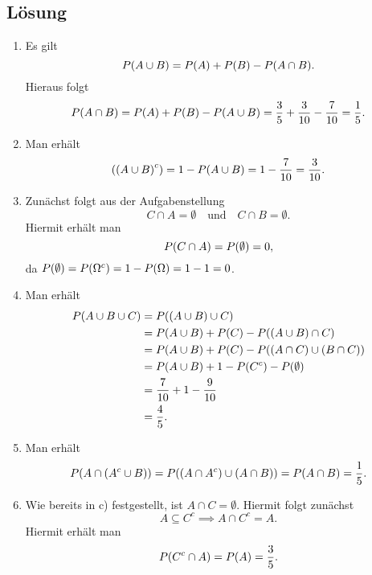 \documentclass{exercise}
\begin{document}
    \subsection*{Lösung}
    \begin{enumerate}
        \item Es gilt
        \[
            P\parentheses*{A \cup B} = P\parentheses*{A} + P\parentheses*{B} - P\parentheses*{A \cap B}.
        \]
        Hieraus folgt
        \[
            P\parentheses*{A \cap B} = P\parentheses*{A} + P\parentheses*{B} - P\parentheses*{A \cup B} = \frac{3}{5} + \frac{3}{10} - \frac{7}{10} = \frac{1}{5}.
        \]
        \item Man erhält
        \[
            \parentheses*{\parentheses*{A \cup B}^c} = 1 - P\parentheses*{A \cup B} = 1 - \frac{7}{10} = \frac{3}{10}.
        \]
        \item Zunächst folgt aus der Aufgabenstellung
        \[
            C \cap A = \emptyset \quad \text{und} \quad C \cap B = \emptyset.
        \]
        Hiermit erhält man
        \[
            P\parentheses*{C \cap A} = P\parentheses*{\emptyset} = 0,
        \]
        da \(P\parentheses*{\emptyset} = P\parentheses*{\Omega^c} = 1 - P\parentheses*{\Omega} = 1 - 1 = 0\).
        \item Man erhält
        \begin{align*}
            P\parentheses*{A \cup B \cup C} &= P\parentheses*{\parentheses*{A \cup B} \cup C}\\
            &= P\parentheses*{A \cup B} + P\parentheses*{C} - P\parentheses*{\parentheses*{A \cup B} \cap C}\\
            &= P\parentheses*{A \cup B} + P\parentheses*{C} - P\parentheses*{\parentheses*{A \cap C} \cup \parentheses*{B \cap C}}\\
            &= P\parentheses*{A \cup B} + 1 - P\parentheses*{C^c} - P\parentheses*{\emptyset}\\
            &= \frac{7}{10} + 1 - \frac{9}{10}\\
            &= \frac{4}{5}.
        \end{align*}
        \item Man erhält
        \[
            P\parentheses*{A \cap \parentheses*{A^c \cup B}} = P\parentheses*{\parentheses*{A \cap A^c} \cup \parentheses*{A \cap B}} = P\parentheses*{A \cap B} = \frac{1}{5}.
        \]
        \item Wie bereits in c) festgestellt, ist \(A \cap C = \emptyset\).
        Hiermit folgt zunächst
        \[
            A \subseteq C^c \implies A \cap C^c = A.
        \]
        Hiermit erhält man
        \[
            P\parentheses*{C^c \cap A} = P\parentheses*{A} = \frac{3}{5}.
        \]
    \end{enumerate}
\end{document}
